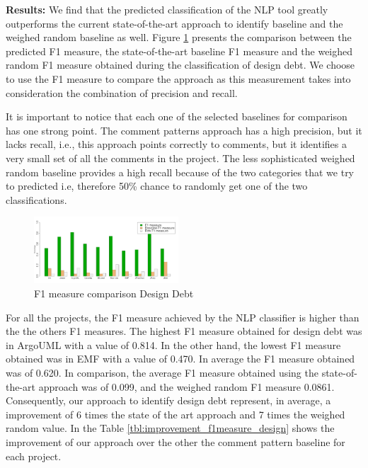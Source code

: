 \vspace{1mm}

\noindent \textbf{Results:} We find that the predicted classification of the NLP tool greatly outperforms the current state-of-the-art approach to identify \SATD baseline and the weighed random baseline as well. Figure \ref{fig:f1_measure_comparison_design_debt} presents the comparison between the predicted F1 measure, the state-of-the-art baseline F1 measure and the weighed random F1 measure obtained during the classification of design debt. We choose to use the F1 measure to compare the approach as this measurement takes into consideration the combination of precision and recall.

It is important to notice that each one of the selected baselines for comparison has one strong point. The comment patterns approach has a high precision, but it lacks recall, i.e., this approach points correctly to \SATD comments, but it identifies a very small set of all the \SATD comments in the project. The less sophisticated weighed random baseline provides a high recall because of the two categories that we try to predicted i.e, therefore 50\% chance to randomly get one of the two classifications. 

\begin{figure}[thb!]
   \centering
  \includegraphics[width=0.48\textwidth]{figures/f1_measure_comparisom_design_2.pdf}
  \vspace{-3mm}
  \caption{F1 measure comparison Design Debt}
  \label{fig:f1_measure_comparison_design_debt}
\end{figure}

For all the projects, the F1 measure achieved by the NLP classifier is higher than the the others F1 measures. The highest F1 measure obtained for design debt was in ArgoUML with a value of 0.814. In the other hand, the lowest F1 measure obtained was in EMF with a value of 0.470. In average the F1 measure obtained was of 0.620. In comparison, the average F1 measure obtained using the state-of-the-art approach was of 0.099, and the weighed random F1 measure 0.0861. Consequently, our approach to identify design debt represent, in average, a improvement of 6 times the state of the art approach and 7 times the weighed random value. In the  Table \ref{tbl:improvement_f1measure_design} shows the improvement of our approach over the other the comment pattern baseline for each project. 
 
